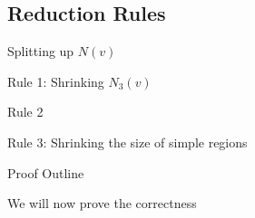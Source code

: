 \subsection{Reduction Rules}

\begin{frame}[c]{Splitting up $N(v)$}

\end{frame}

\begin{frame}[c]{Rule 1: Shrinking $N_3(v)$}

\end{frame}

\begin{frame}[c]{Rule 2}

\end{frame}

\begin{frame}[c]{Rule 3: Shrinking the size of simple regions}

\end{frame}

\begin{frame}[c]{Proof Outline}

    We will now prove the correctness

\end{frame}

